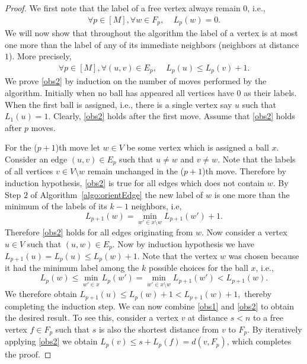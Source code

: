 \begin{proof}
We first note that the label of a free vertex always remain $0$, i.e.,
\begin{align}\label{obs1} \forall p\in [M], \forall w\in F_p, ~~~~~L_p(w)=0. \end{align}
We will now show that throughout the algorithm the label of a vertex is at most one more than the label of any of its immediate neighbors (neighbors at distance $1$). More precisely,
\begin{align}\label{obs2}
\forall p\in [M], \forall (u,v)\in E_p, ~~~~~ L_p(u)\le L_p(v)+1. \end{align}
We prove \eqref{obs2} by induction on the number of moves performed by the algorithm. Initially when no ball has appeared all vertices have $0$ as their labels. When the first ball is assigned, i.e., there is a single vertex say $u$ such that $L_1(u)=1$. Clearly, \eqref{obs2} holds after the first move. Assume that \eqref{obs2} holds after $p$ moves.

For the ($p+1$)th move let $w\in V$ be some vertex which is assigned a ball $x$. Consider an edge $(u,v)\in E_p$ such that $u\neq w$ and $v\neq w$. Note that the labels of all vertices $v \in V\setminus w$ remain unchanged in the ($p+1$)th move. Therefore by induction hypothesis, \eqref{obs2} is true for all edges which does not contain $w$. By Step $2$ of Algorithm~\ref{algo:orientEdge} the new label of $w$ is one more than the minimum of the labels of its $k-1$ neighbors, i.e, \[L_{p+1}(w) =  \min_{w'\in x\setminus w} L_{p+1}(w') +1.\] Therefore \eqref{obs2} holds for all edges originating from $w$. Now consider a vertex $u\in V$ such that $(u,w)\in E_p$. Now by induction hypothesis we have $L_{p+1}(u)=L_p(u)\le L_p(w) +1.$ Note that the vertex $w$ was chosen because it had the minimum label among the $k$ possible choices for the ball $x$, i.e., 
\[ L_p(w) \le \min_{w'\in x} L_{p} (w') = \min_{w'\in x\setminus w} L_{p+1} (w') < L_{p+1}(w).\] We therefore obtain
$ L_{p+1}(u)\le L_p(w) +1 < L_{p+1}(w) +1,$
thereby completing the induction step.
We can now combine \eqref{obs1} and \eqref{obs2} to obtain the desired result. To see this, consider a vertex $v$ at distance $s< n$ to a free vertex $f\in F_p$ such that $s$ is also the shortest distance from $v$ to $F_p$.  By iteratively applying \eqref{obs2} we obtain $L_p(v) \le s+ L_p(f) =d(v,F_p)$, which completes the proof.
\end{proof}
